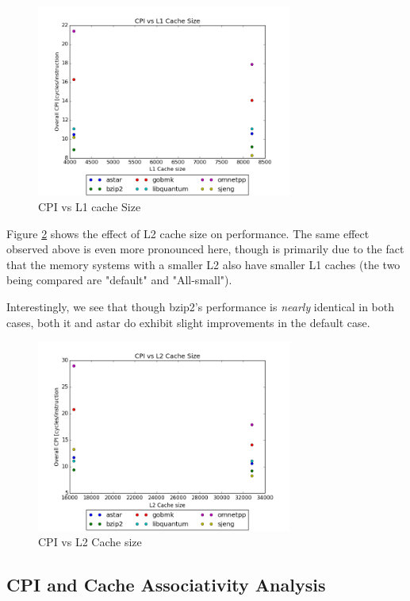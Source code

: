 \documentclass{article}
\begin{document}
\begin{figure}[ht]
    \centering
    \includegraphics[width=0.75\textwidth]{plots/CPI_vs_L1cache_size.png}
    \caption{CPI vs L1 cache Size}
    \label{fig:cpivsl1size}
\end{figure}

Figure \ref{fig:cpivsl2size} shows the effect of L2 cache size on performance.
The same effect observed above is even more pronounced here, though is primarily
due to the fact that the memory systems with a smaller L2 also have smaller L1
caches (the two being compared are "default" and "All-small").

Interestingly, we see that though bzip2's performance is \emph{nearly} identical
in both cases, both it and astar do exhibit slight improvements in the default
case.

\begin{figure}[ht]
    \centering
    \includegraphics[width=0.75\textwidth]{plots/CPI_vs_L2Cache_size.png}
    \caption{CPI vs L2 Cache size}
    \label{fig:cpivsl2size}
\end{figure}

\subsection{CPI and Cache Associativity Analysis}
\end{document}
